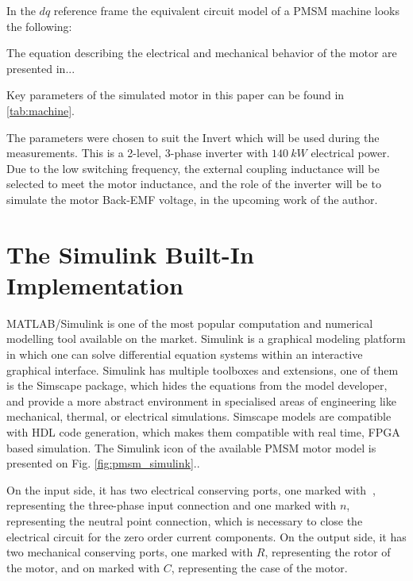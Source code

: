 \documentclass[twoside,b5paper,10pt]{article}
\begin{document}
In the $dq$ reference frame the equivalent circuit model of a PMSM machine looks the following:


The equation describing the electrical and mechanical behavior of the motor are presented in...


Key parameters of the simulated motor in this paper can be found in \ref{tab:machine}.



The parameters were chosen to suit the Invert which will be used during the measurements. This is a 2-level, 3-phase inverter with $140\ kW$ electrical power. Due to the low switching frequency, the external coupling inductance will be selected to meet the motor inductance, and the role of the inverter will be to simulate the motor Back-EMF voltage, in the upcoming work of the author.
\section{The Simulink Built-In Implementation}
\label{sec:simulink_model}

MATLAB/Simulink is one of the most popular computation and numerical modelling tool available on the market. Simulink is a graphical modeling platform in which one can solve differential equation systems within an interactive graphical interface. Simulink has multiple toolboxes and extensions, one of them is the Simscape package, which hides the equations from the model developer, and provide a more abstract environment in specialised areas of engineering like mechanical, thermal, or electrical simulations. Simscape models are compatible with HDL code generation, which makes them compatible with real time, FPGA based simulation. The Simulink icon of the available PMSM motor model is presented on Fig. \ref{fig:pmsm_simulink}..



On the input side, it has two electrical conserving ports, one marked with $~$, representing the three-phase input connection and one marked with $n$, representing the neutral point connection, which is necessary to close the electrical circuit for the zero order current components. On the output side, it has two mechanical conserving ports, one marked with $R$, representing the rotor of the motor, and on marked with $C$, representing the case of the motor.
\end{document}
